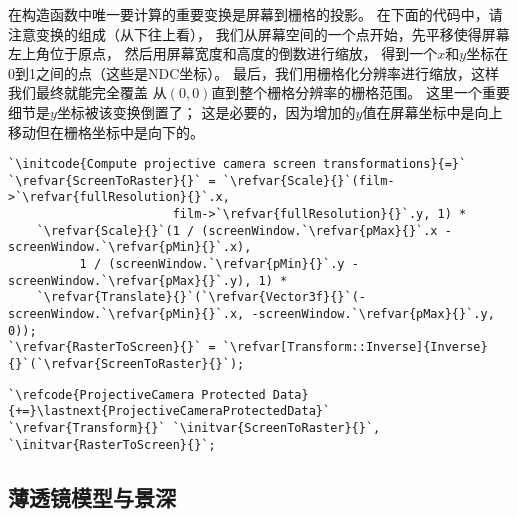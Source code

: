 在构造函数中唯一要计算的重要变换是屏幕到栅格的投影。
在下面的代码中，请注意变换的组成（从下往上看），
我们从屏幕空间的一个点开始，先平移使得屏幕左上角位于原点，
然后用屏幕宽度和高度的倒数进行缩放，
得到一个$x$和$y$坐标在0到1之间的点（这些是NDC坐标）。
最后，我们用栅格化分辨率进行缩放，这样我们最终就能完全覆盖
从$(0,0)$直到整个栅格分辨率的栅格范围。
这里一个重要细节是$y$坐标被该变换倒置了；
这是必要的，因为增加的$y$值在屏幕坐标中是向上移动但在栅格坐标中是向下的。
\begin{lstlisting}
`\initcode{Compute projective camera screen transformations}{=}`
`\refvar{ScreenToRaster}{}` = `\refvar{Scale}{}`(film->`\refvar{fullResolution}{}`.x, 
                       film->`\refvar{fullResolution}{}`.y, 1) *
    `\refvar{Scale}{}`(1 / (screenWindow.`\refvar{pMax}{}`.x - screenWindow.`\refvar{pMin}{}`.x),
          1 / (screenWindow.`\refvar{pMin}{}`.y - screenWindow.`\refvar{pMax}{}`.y), 1) *
    `\refvar{Translate}{}`(`\refvar{Vector3f}{}`(-screenWindow.`\refvar{pMin}{}`.x, -screenWindow.`\refvar{pMax}{}`.y, 0));
`\refvar{RasterToScreen}{}` = `\refvar[Transform::Inverse]{Inverse}{}`(`\refvar{ScreenToRaster}{}`);
\end{lstlisting}
\begin{lstlisting}
`\refcode{ProjectiveCamera Protected Data}{+=}\lastnext{ProjectiveCameraProtectedData}`
`\refvar{Transform}{}` `\initvar{ScreenToRaster}{}`, `\initvar{RasterToScreen}{}`;
\end{lstlisting}

\subsection{薄透镜模型与景深}\label{sub:薄透镜模型与景深}